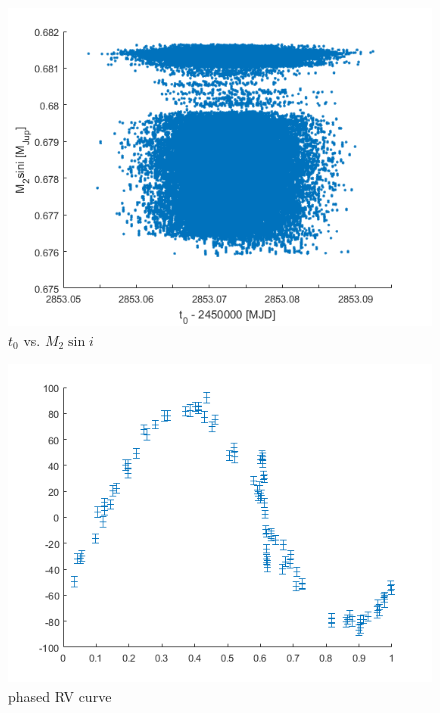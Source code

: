 \documentclass[10pt,letterpaper]{report}
\begin{document}
\begin{figure} [h]
\includegraphics[scale=1]{scatter_t0M.png}
\caption{$t_0$ vs. $M_2\sin{i}$}
\end{figure}

\begin{figure} [h]
\includegraphics[scale=1]{periodgram.png}
\caption{phased RV curve}
\end{figure}

\newpage
\end{document}
